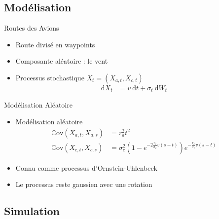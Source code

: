 \documentclass{beamer} %
\begin{document}
	\subsection{Modélisation} %
	\label{subsec:modelisation}
	
	\begin{frame}[t]{Routes des Avions}
		\begin{itemize}
			\item<+-> Route divisé en waypoints
			\item<+-> Composante aléatoire : le vent
			\item<+-> Processus stochastique $X_t=(X_{a,t},X_{c,t})$
			\begin{align*}
				\mathrm d X_t &= v ~ \mathrm d t+\sigma_t ~ \mathrm d W_t
			\end{align*}
			
		\end{itemize}
	\end{frame}
	\begin{frame}[t]{Modélisation Aléatoire}
		\begin{itemize}
			\item<+->  Modélisation aléatoire 
			\begin{align*}
				\mathbb{C}\mathrm{ov}(X_{a,t},X_{a,s}) &= r_a^2 t^2 \\
				\mathbb{C}\mathrm{ov}(X_{c,t},X_{c,s}) &= \sigma_{c}^2 (1-e^{-2\frac{r_c}{\sigma_c}v(s-t)})e^{-\frac{r_c}{\sigma_c}v(s-t)}
			\end{align*}
			\item<+-> Connu comme processus d'Ornstein-Uhlenbeck
			\item<+-> Le processus reste gaussien avec une rotation
			
		\end{itemize}
	\end{frame}
	
	\subsection{Simulation} %
	\label{subsec:simulation}
	
\end{document}
